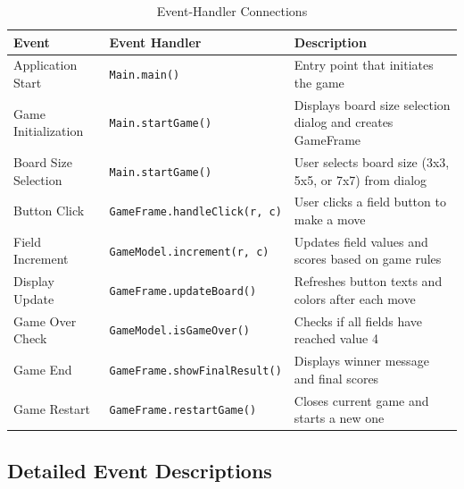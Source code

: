 \documentclass[12pt,a4paper]{article}
\begin{document}
\begin{table}[H]
\centering
\begin{tabularx}{\textwidth}{|l|X|X|}
\hline
\textbf{Event} & \textbf{Event Handler} & \textbf{Description} \\
\hline
Application Start & \texttt{Main.main()} & Entry point that initiates the game \\
\hline
Game Initialization & \texttt{Main.startGame()} & Displays board size selection dialog and creates GameFrame \\
\hline
Board Size Selection & \texttt{Main.startGame()} & User selects board size (3x3, 5x5, or 7x7) from dialog \\
\hline
Button Click & \texttt{GameFrame.handleClick(r, c)} & User clicks a field button to make a move \\
\hline
Field Increment & \texttt{GameModel.increment(r, c)} & Updates field values and scores based on game rules \\
\hline
Display Update & \texttt{GameFrame.updateBoard()} & Refreshes button texts and colors after each move \\
\hline
Game Over Check & \texttt{GameModel.isGameOver()} & Checks if all fields have reached value 4 \\
\hline
Game End & \texttt{GameFrame.showFinalResult()} & Displays winner message and final scores \\
\hline
Game Restart & \texttt{GameFrame.restartGame()} & Closes current game and starts a new one \\
\hline
\end{tabularx}
\caption{Event-Handler Connections}
\label{tab:events}
\end{table}

\subsection{Detailed Event Descriptions}
\end{document}

